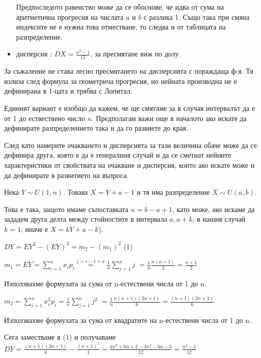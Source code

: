 \documentclass[fleqn,12pt]{article}
\begin{document}
\begin{justify}
\begin{itemize}
    Предпоследото равенство може да се обоснове, че идва от сума на аритметична прогресия на числата $a$ и $b$ с разлика
    1. Също така при смяна индексите не е нужна това отместване, то следва и от таблицата на разпределение.

    \item дисперсия : $DX = \frac{n^2 - 1}{12}$, за пресмятане виж по долу.
\end{itemize}

За съжаление не става лесно пресмятането на дисперсията с пораждаща ф-я. Тя излиза след формула за геометрича прогресия,
но нейната производна не е дефинирана в 1-цата и трябва с Лопитал. 

Единият вариант е изобщо да кажем, че ще смятаме за в случая интервалът да е от 1 до ествествено число $n$. Предполагам
важи още в началото ако искате да дефинирате разпределението така и да го развиете до края. 

След като намерите очакването и дисперсията за тази величина обаче може да се дефинира друга, която е да е генералния
случай и да се сметнат нейните характеристики от свойствата на очакване и дисперсия, които ако искате може и да
дефинирате в развитието на въпроса.

Нека $Y \sim U(1, n)$. Товава $X = Y + a - 1$ и тя има разпределение $X \sim U(a, b)$.

Това е така, защото имаме съпоставката $n = b - a + 1$, като може, ако искаме  да зададем друга делта между стойностите
в интервала $a, a+k$, в нашия случай $k=1$; иначе е $X = kY + a - k$).

\vspace{10pt}
$DY = EY^2 - (EY)^2  = m_2 - (m_1)^2$ \indent (1)

$m_1 = EY = \sum_{i=1}^n x_ip_i \overset{j = i-1+a}{=} \frac{1}{n} \sum_{j=1}^n j$
$ = \frac{1}{n} \frac{n(n+1)}{2} = \frac{n+1}{2}$

Използвахме формулата за сума от n-естествени числа от 1 до n.
\vspace{10pt}

$m_2 = \sum_{i=1}^n x_i^2 p_i = \frac{1}{n} \sum_{j=1}^n j^2 $ 
$ = \frac{1}{n} \frac{n(n+1)(2n+1)}{6} = \frac{(n+1)(2n+1)}{6}$

Използвахме формулата за сума от квадратите на n-естествени числа от 1 до n.

\vspace{10pt}
Сега заместваме в (1) и получаваме 
$DY = \frac{(n+1)(2n+1)}{6} - \frac{(n+1)^2}{4} = \frac{4n^2+6n+2 - 3n^2-6n-3}{12} = \frac{n^2 - 1}{12}$


\end{justify}
\end{document}
